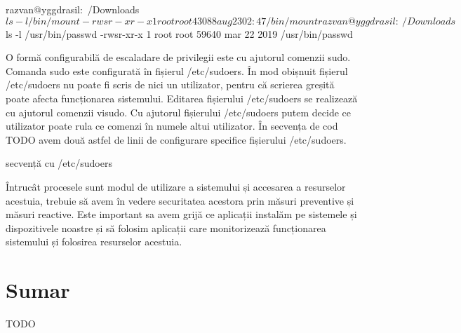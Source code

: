 razvan@yggdrasil:~/Downloads$ ls -l /bin/mount
-rwsr-xr-x 1 root root 43088 aug 23 02:47 /bin/mount
razvan@yggdrasil:~/Downloads$ ls -l /usr/bin/passwd
-rwsr-xr-x 1 root root 59640 mar 22  2019 /usr/bin/passwd

O formă configurabilă de escaladare de privilegii este cu ajutorul comenzii sudo. Comanda sudo este configurată în fișierul /etc/sudoers. În mod obișnuit fișierul /etc/sudoers nu poate fi scris de nici un utilizator, pentru că scrierea greșită poate afecta funcționarea sistemului. Editarea fișierului /etc/sudoers se realizează cu ajutorul comenzii visudo. Cu ajutorul fișierului /etc/sudoers putem decide ce utilizator poate rula ce comenzi în numele altui utilizator. În secvența de cod TODO avem două astfel de linii de configurare specifice fișierului /etc/sudoers.

secvență cu /etc/sudoers

Întrucât procesele sunt modul de utilizare a sistemului și accesarea a resurselor acestuia, trebuie să avem în vedere securitatea acestora prin măsuri preventive și măsuri reactive. Este important sa avem grijă ce aplicații instalăm pe sistemele și dispozitivele noastre și să folosim aplicații care monitorizează funcționarea sistemului și folosirea resurselor acestuia.

\section{Sumar}
\label{sec:sec:summary}

TODO
